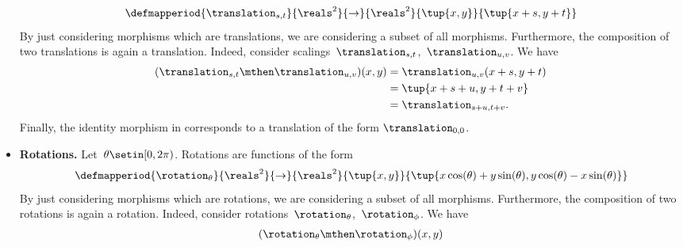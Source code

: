 \begin{solution}
\begin{itemize}
\begin{equation}
                  \defmapperiod{
                      \translation_{s,t}
                  }{
                      \reals^2
                  }{
                      \to
                  }{
                      \reals^2
                  }{
                      \tup{x,y}
                  }{
                      \tup{x+s,y+t}
                  }
              \end{equation}
              By just considering morphisms which are translations, we are considering a subset of all morphisms.
              Furthermore, the composition of two translations is again a translation.
              Indeed, consider scalings~$\translation_{s,t}$,~$\translation_{u,v}$.
              We have
              \begin{equation}
                  \begin{aligned}
                      (\translation_{s,t}\mthen \translation_{u,v})(x,y)
                       & =\translation_{u,v}(x+s, y+t) \\
                       & =\tup{x+s+u, y+t+v} \\
                       & =\translation_{s+u,t+v}.
                  \end{aligned}
              \end{equation}
              Finally, the identity morphism in \Draw corresponds to a translation of the form $\translation_{0,0}$.
        \item \textbf{Rotations.}
              Let~$\theta \setin [0,2\pi)$.
              Rotations are functions of the form
              \begin{equation}
                  \defmapperiod{
                      \rotation_{\theta}
                  }{
                      \reals^2
                  }{
                      \to
                  }{
                      \reals^2
                  }{
                      \tup{x,y}
                  }{
                      \tup{x\cos(\theta)+y\sin(\theta), y\cos(\theta)-x\sin(\theta)}
                  }
              \end{equation}
              By just considering morphisms which are rotations, we are considering a subset of all morphisms.
              Furthermore, the composition of two rotations is again a rotation.
              Indeed, consider rotations~$\rotation_{\theta}$,~$\rotation_{\phi}$.
              We have
              \begin{equation}
                  \begin{aligned}
                      (\rotation_{\theta}\mthen \rotation_{\phi})(x,y)

\end{aligned}
\end{equation}
\end{itemize}
\end{solution}
